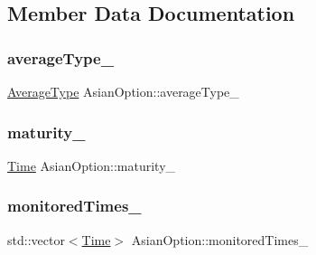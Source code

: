 \subsection{Member Data Documentation}
\hypertarget{class_asian_option_a602d4f41bc033a8242a0641cf5104045}{}\label{class_asian_option_a602d4f41bc033a8242a0641cf5104045} 
\subsubsection{\texorpdfstring{average\+Type\+\_\+}{averageType\_}}
{\footnotesize\ttfamily \hyperlink{class_asian_option_add7292791bf85820ff9fdbfd4407f3b9}{Average\+Type} Asian\+Option\+::average\+Type\+\_\+\hspace{0.3cm}{\ttfamily [private]}}

\hypertarget{class_asian_option_aff2f0be31b55a1b859cde9ee9b339075}{}\label{class_asian_option_aff2f0be31b55a1b859cde9ee9b339075} 
\subsubsection{\texorpdfstring{maturity\+\_\+}{maturity\_}}
{\footnotesize\ttfamily \hyperlink{_name_def_8h_ac2d3e0ba793497bcca555c7c2cf64ff3}{Time} Asian\+Option\+::maturity\+\_\+\hspace{0.3cm}{\ttfamily [private]}}

\hypertarget{class_asian_option_a8cc25f4cabd8ceac95a69598481f18c8}{}\label{class_asian_option_a8cc25f4cabd8ceac95a69598481f18c8} 
\subsubsection{\texorpdfstring{monitored\+Times\+\_\+}{monitoredTimes\_}}
{\footnotesize\ttfamily std\+::vector$<$\hyperlink{_name_def_8h_ac2d3e0ba793497bcca555c7c2cf64ff3}{Time}$>$ Asian\+Option\+::monitored\+Times\+\_\+\hspace{0.3cm}{\ttfamily [private]}}

\hypertarget{class_asian_option_abb0ef9b7f812435dcf24e4dd8edb2be2}{}\label{class_asian_option_abb0ef9b7f812435dcf24e4dd8edb2be2} 
